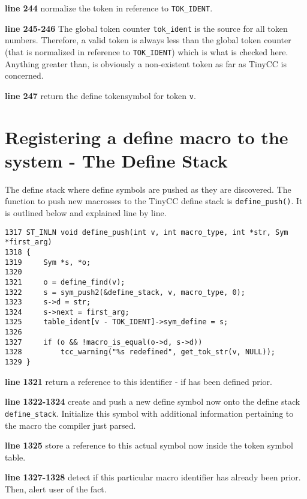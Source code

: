 \begin{tcc_desc}
\textbf{line 244} normalize the token in reference to \verb|TOK_IDENT|.

\textbf{line 245-246} The global token counter \verb|tok_ident| is the source for all token numbers. Therefore, a valid token is always less than the global token counter (that is normalized in reference to \verb|TOK_IDENT|) which is what is checked here. Anything greater than, is obviously a non-existent token as far as TinyCC is concerned.

\textbf{line 247} return the define tokensymbol for token \verb|v|.
\end{tcc_desc}


\section{Registering a define macro to the system - The Define Stack}

The define stack where define symbols are pushed as they are discovered. The function to push new macrosses to the TinyCC define stack is \verb|define_push()|. It is outlined below and explained line by line.

\begin{verbatim}
1317 ST_INLN void define_push(int v, int macro_type, int *str, Sym *first_arg)
1318 {
1319     Sym *s, *o;
1320
1321     o = define_find(v);
1322     s = sym_push2(&define_stack, v, macro_type, 0);
1323     s->d = str;
1324     s->next = first_arg;
1325     table_ident[v - TOK_IDENT]->sym_define = s;
1326
1327     if (o && !macro_is_equal(o->d, s->d))
1328         tcc_warning("%s redefined", get_tok_str(v, NULL));
1329 }
\end{verbatim}

\begin{tcc_desc}
\textbf{line 1321} return a reference to this identifier - if has been defined prior.

\textbf{line 1322-1324} create and push a new define symbol now onto the define stack \verb|define_stack|. Initialize this symbol with additional information pertaining to the macro the compiler just parsed.

\textbf{line 1325} store a reference to this actual symbol now inside the token symbol table.

\textbf{line 1327-1328} detect if this particular macro identifier has already been prior. Then, alert user of the fact.

\end{tcc_desc}

